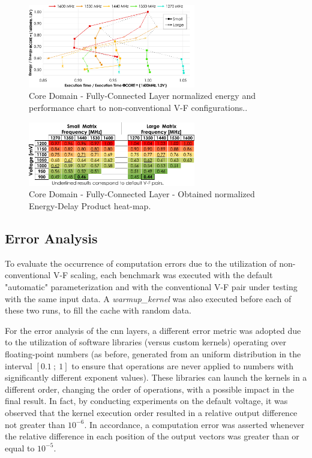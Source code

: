 \begin{figure}[htbp]
    \centering
        \includegraphics[width=0.65\textwidth]{Figures/Application To Deep Learning/MatrixMul_behaviour.pdf}
        \caption{Core Domain - Fully-Connected Layer normalized energy and performance chart to non-conventional V-F configurations..}
    \label{fig:MatrixMult_behaviour}
\end{figure}





\begin{figure}[htbp]
    \centering
        \includegraphics[width=0.65\textwidth]{Figures/Application To Deep Learning/MatrixMul_EDP.pdf}
        \caption{Core Domain - Fully-Connected Layer - Obtained normalized Energy-Delay Product heat-map.}
    \label{fig:MatrixMult_EDP}
\end{figure}

\subsection{Error Analysis}

To evaluate the occurrence of computation errors due to the utilization of non-conventional V-F scaling, each benchmark was executed with the default "automatic" parameterization and with the conventional V-F pair under testing with the same input data. A \textit{warmup\_kernel} was also executed before each of these two runs, to fill the cache with random data. 


For the error analysis of the \acrshort{cnn} layers, a different error metric was adopted due to the utilization of software libraries (versus custom kernels) operating over floating-point numbers (as before, generated from an uniform distribution in the interval $[0.1~;~1]$ to ensure that operations are never applied to numbers with significantly different exponent values). These libraries can launch the kernels in a different order, changing the order of operations, with a possible impact in the final result. In fact, by conducting experiments on the default voltage, it was observed that the kernel execution order resulted in a relative output difference not greater than $10^{-6}$. In accordance, a computation error was asserted whenever the relative difference in each position of the output vectors was greater than or equal to  $10^{-5}$.

